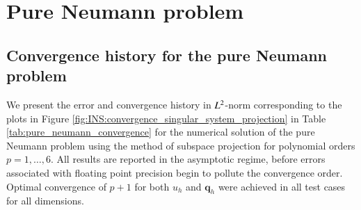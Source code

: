 \section{Pure Neumann problem}

\subsection{Convergence history for the pure Neumann problem}%
\label{sec:convergence_history_pure_neumann}
We present the error and convergence history in $L^2$-norm corresponding to the plots in Figure \ref{fig:INS:convergence_singular_system_projection} in Table \ref{tab:pure_neumann_convergence} for the numerical solution of the pure Neumann problem using the method of subspace projection for polynomial orders $p=1, \ldots, 6$.  
All results are reported in the asymptotic regime, before errors associated with floating point precision begin to pollute the convergence order.
Optimal convergence of $p+1$ for both $u_h$ and $\bm{q}_h$ were achieved in all test cases for all dimensions.\\


